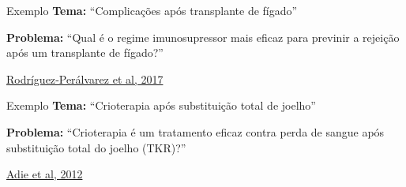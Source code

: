 \documentclass{beamer}
\begin{document}
\begin{frame}
  \begin{exampleblock}{Exemplo}
    \small
    {\bf Tema: }``Complicações após transplante de fígado''

    \bigskip

    {\bf Problema:} ``Qual é o regime imunosupressor mais eficaz para previnir a rejeição após um transplante de fígado?''
  \end{exampleblock}

  \vfill
  \scriptsize
  \hfill \href{https://doi.org/10.1002/14651858.cd011639.pub2}{Rodríguez‐Perálvarez et al, 2017}
\end{frame}





\begin{frame}
  \begin{exampleblock}{Exemplo}
    \small
    {\bf Tema: }``Crioterapia após substituição total de joelho''

    \bigskip

    {\bf Problema:} ``Crioterapia é um tratamento eficaz contra perda de sangue após substituição total do joelho (TKR)?''
  \end{exampleblock}

  \vfill
  \scriptsize
  \hfill \href{https://doi.org/10.1002/14651858.CD007911.pub2}{Adie et al, 2012}
\end{frame}
\end{document}
